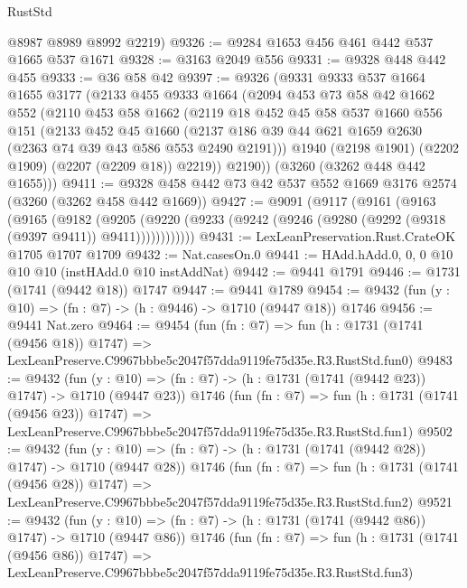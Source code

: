 \begin{lexlean}{RustStd}
\begin{coremodule}
      @8987
      @8989
      @8992
      @2219)
@9326 := @9284 @1653 @456 @461 @442 @537 @1665 @537 @1671
@9328 := @3163 @2049 @556
@9331 := @9328 @448 @442 @455
@9333 := @36 @58 @42
@9397 := @9326
    (@9331
      @9333
      @537
      @1664
      @1655
      @3177
      (@2133
        @455
        @9333
        @1664
        (@2094
          @453
          @73
          @58
          @42
          @1662
          @552
          (@2110
            @453
            @58
            @1662
            (@2119
              @18
              @452
              @45
              @58
              @537
              @1660
              @556
              @151
              (@2133
                @452
                @45
                @1660
                (@2137 @186 @39 @44 @621 @1659 @2630 (@2363 @74 @39 @43 @586 @553 @2490 @2191)))
              @1940
              (@2198 @1901)
              (@2202 @1909)
              (@2207 (@2209 @18))
              @2219))
          @2190))
      (@3260 (@3262 @448 @442 @1655)))
@9411 := @9328 @458 @442 @73 @42 @537 @552 @1669 @3176 @2574 (@3260 (@3262 @458 @442 @1669))
@9427 := @9091
    (@9117
      (@9161
        (@9163
          (@9165
            (@9182
              (@9205
                (@9220 (@9233 (@9242 (@9246 (@9280 (@9292 (@9318 (@9397 @9411)) @9411))))))))))))
@9431 := LexLeanPreservation.Rust.CrateOK @1705 @1707 @1709
@9432 := Nat.casesOn.{0}
@9441 := HAdd.hAdd.{0, 0, 0} @10 @10 @10 (instHAdd.{0} @10 instAddNat)
@9442 := @9441 @1791
@9446 := @1731 (@1741 (@9442 @18)) @1747
@9447 := @9441 @1789
@9454 := @9432 (fun (y : @10) => (fn : @7) -> (h : @9446) -> @1710 (@9447 @18)) @1746
@9456 := @9441 Nat.zero
@9464 := @9454
    (fun (fn : @7) =>
    fun (h : @1731 (@1741 (@9456 @18)) @1747) =>
    LexLeanPreserve.C9967bbbe5c2047f57dda9119fe75d35e.R3.RustStd.fun0)
@9483 := @9432
    (fun (y : @10) => (fn : @7) -> (h : @1731 (@1741 (@9442 @23)) @1747) -> @1710 (@9447 @23))
    @1746
    (fun (fn : @7) =>
    fun (h : @1731 (@1741 (@9456 @23)) @1747) =>
    LexLeanPreserve.C9967bbbe5c2047f57dda9119fe75d35e.R3.RustStd.fun1)
@9502 := @9432
    (fun (y : @10) => (fn : @7) -> (h : @1731 (@1741 (@9442 @28)) @1747) -> @1710 (@9447 @28))
    @1746
    (fun (fn : @7) =>
    fun (h : @1731 (@1741 (@9456 @28)) @1747) =>
    LexLeanPreserve.C9967bbbe5c2047f57dda9119fe75d35e.R3.RustStd.fun2)
@9521 := @9432
    (fun (y : @10) => (fn : @7) -> (h : @1731 (@1741 (@9442 @86)) @1747) -> @1710 (@9447 @86))
    @1746
    (fun (fn : @7) =>
    fun (h : @1731 (@1741 (@9456 @86)) @1747) =>
    LexLeanPreserve.C9967bbbe5c2047f57dda9119fe75d35e.R3.RustStd.fun3)

\end{coremodule}
\end{lexlean}
